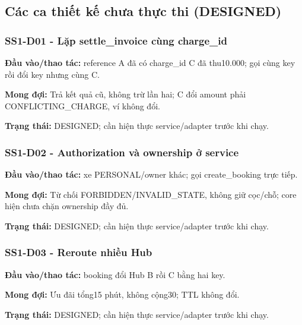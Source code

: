 \documentclass[11pt,a4paper]{article}
\begin{document}
\hypertarget{cuxe1c-ca-thiux1ebft-kux1ebf-chux1b0a-thux1ef1c-thi-designed}{%
\subsection{Các ca thiết kế chưa thực thi
(DESIGNED)}\label{cuxe1c-ca-thiux1ebft-kux1ebf-chux1b0a-thux1ef1c-thi-designed}}

\hypertarget{ss1-d01---lux1eb7p-settle_invoice-cuxf9ng-charge_id}{%
\subsubsection{SS1-D01 - Lặp settle\_invoice cùng
charge\_id}\label{ss1-d01---lux1eb7p-settle_invoice-cuxf9ng-charge_id}}

\textbf{Đầu vào/thao tác:} reference A đã có charge\_id C đã thu10.000;
gọi cùng key rồi đổi key nhưng cùng C.

\textbf{Mong đợi:} Trả kết quả cũ, không trừ lần hai; C đổi amount phải
CONFLICTING\_CHARGE, ví không đổi.

\textbf{Trạng thái:} DESIGNED; cần hiện thực service/adapter trước khi
chạy.

\hypertarget{ss1-d02---authorization-vuxe0-ownership-ux1edf-service}{%
\subsubsection{SS1-D02 - Authorization và ownership ở
service}\label{ss1-d02---authorization-vuxe0-ownership-ux1edf-service}}

\textbf{Đầu vào/thao tác:} xe PERSONAL/owner khác; gọi create\_booking
trực tiếp.

\textbf{Mong đợi:} Từ chối FORBIDDEN/INVALID\_STATE, không giữ cọc/chỗ;
core hiện chưa chặn ownership đầy đủ.

\textbf{Trạng thái:} DESIGNED; cần hiện thực service/adapter trước khi
chạy.

\hypertarget{ss1-d03---reroute-nhiux1ec1u-hub}{%
\subsubsection{SS1-D03 - Reroute nhiều
Hub}\label{ss1-d03---reroute-nhiux1ec1u-hub}}

\textbf{Đầu vào/thao tác:} booking đổi Hub B rồi C bằng hai key.

\textbf{Mong đợi:} Ưu đãi tổng15 phút, không cộng30; TTL không đổi.

\textbf{Trạng thái:} DESIGNED; cần hiện thực service/adapter trước khi
chạy.
\end{document}
